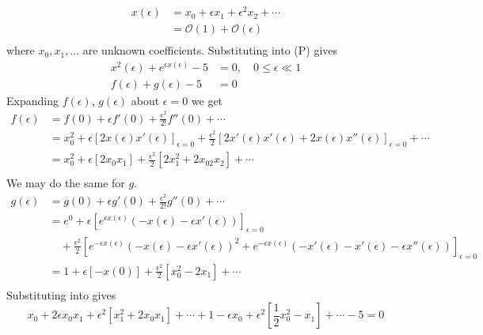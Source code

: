 \documentclass[12pt,twoside]{article}
\begin{document}
\begin{equation*}
  \begin{aligned}
    x(\epsilon)&=x_0+\epsilon x_1 + \epsilon^2x_2+\cdots \\
    &= \mathcal{O}(1) + \mathcal{O}(\epsilon) \\
  \end{aligned}
\end{equation*}
where $x_0, x_1,\ldots$ are unknown coefficients. Substituting into (P) gives
\begin{equation*}
  \begin{aligned}
    x^2(\epsilon)+e^{\epsilon x(\epsilon)} - 5 &= 0,\quad 0\le\epsilon\ll1 \\
    f(\epsilon) + g(\epsilon) -5 &= 0
  \end{aligned}
\end{equation*}
Expanding $f(\epsilon)$, $g(\epsilon)$ about $\epsilon=0$ we get
\begin{equation*}
  \begin{aligned}
    f(\epsilon) &= f(0) + \epsilon f'(0) + \frac{\epsilon^2}{2!}f''(0)+\cdots \\
    &= x^2_{0} + \epsilon[2x(\epsilon)x'(\epsilon)]_{\epsilon=0} +
    \frac{\epsilon^2}{2}[2x'(\epsilon)x'(\epsilon)+2x(\epsilon)x''(\epsilon)]_{\epsilon=0}
    + \cdots \\
    &= x_0^2+\epsilon[2x_0x_1] + \frac{\epsilon^2}{2}[2x_1^2 + 2x_02x_2] + \cdots \\
  \end{aligned}
\end{equation*}
We may do the same for $g$.
\begin{equation*}
  \begin{aligned}
    g(\epsilon) &= g(0) + \epsilon g'(0) + \frac{\epsilon^2}{2!}g''(0) + \cdots \\
    &= e^0+\epsilon[e^{\epsilon x(\epsilon)}(-x(\epsilon)-\epsilon x'(\epsilon))]_{\epsilon=0} \\
    &\quad+ \frac{\epsilon^2}{2}[e^{-\epsilon x(\epsilon)}(-x(\epsilon)-\epsilon x'(\epsilon))^2
    + e^{-\epsilon x(\epsilon)}(-x'(\epsilon)-x'(\epsilon)-\epsilon x''(\epsilon))]_{\epsilon=0} \\
    &= 1 + \epsilon[-x(0)]+\frac{\epsilon^2}{2}[x_0^2-2x_1] + \cdots \\
  \end{aligned}
\end{equation*}
Substituting into  gives
\begin{equation*}
  x_0 + 2\epsilon x_0x_1+\epsilon^2[x_1^2+2x_0x_1]+\cdots + 1 - \epsilon x_0 +
  \epsilon^2[\frac{1}{2}x_0^2-x_1] + \cdots - 5 = 0
\end{equation*}
\end{document}
